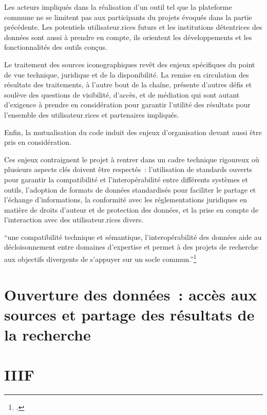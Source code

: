 Les acteurs impliqués dans la réalisation d'un outil tel que la
plateforme commune \aikon ne se limitent pas aux participants du projets évoqués
dans la partie précédente. Les potentiels utilisateur.rices futurs et les
institutions détentrices des données sont aussi à prendre en compte,
ils orientent les développements et les fonctionnalités des
outils conçus.

Le traitement des sources iconographiques revêt des enjeux spécifiques
du point de vue technique, juridique et de la disponibilité. La remise
en circulation des résultats des traitements, à l'autre bout de la
chaîne, présente d'autres défis et soulève des questions de visibilité,
d'accès, et de médiation qui sont autant d'exigence à prendre en
considération pour garantir l'utilité des résultats pour l'ensemble des
utilisateur.rices et partenaires impliqués.

Enfin, la mutualisation du code induit des enjeux d'organisation devant aussi être pris en considération.

Ces enjeux contraignent le projet à rentrer dans un cadre technique
rigoureux où plusieurs aspects clés doivent être respectés~:
l'utilisation de standards ouverts pour garantir la compatibilité et
l'interopérabilité entre différents systèmes et outils, l'adoption de
formats de données standardisés pour faciliter le partage et l'échange
d'informations, la conformité avec les réglementations juridiques en
matière de droits d'auteur et de protection des données, et la prise en
compte de l'interaction avec des utilisateur.rices divers.

\begin{kwote}
``une compatibilité technique et sémantique, l'interopérabilité des
données aide au décloisonnement entre domaines d'expertise et permet à
des projets de recherche aux objectifs divergents de s'appuyer sur un
socle commun.''\footcite[p. xvii]{albouy_mediation_2019}
\end{kwote}

                \hypertarget{ouverture-donnees}{%
                \section{Ouverture des données~: accès aux sources et partage des résultats de la recherche}\label{ouverture-donnees}}
                        
            
                \hypertarget{iiif}{%
                \section{IIIF}\label{iiif}}
                        

